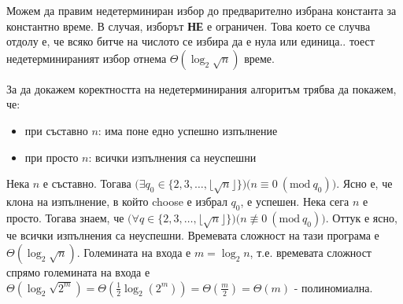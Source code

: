 \begin{solution}
\begin{pseudocode}
{			\KwRet{\Fail\;}
		}
	\end{pseudocode}
	\begin{remark*}
		Можем да правим недетерминиран избор до предварително избрана константа за константно време. В случая, изборът \textbf{НЕ} е ограничен. Това което се случва отдолу е, че всяко битче на числото се избира да е нула или единица.. тоест недетерминираният избор отнема $\Theta(\log_2{\sqrt n})$ време.
	\end{remark*}
	За да докажем коректността на недетерминирания алгоритъм трябва да покажем, че:
	\begin{itemize}
		\item при съставно $n$: има поне едно успешно изпълнение
		\item при просто $n$: всички изпълнения са неуспешни
	\end{itemize}
	Нека $n$ е съставно. Тогава $\big(\exists q_0\in\{2,3,\dots,\lfloor\sqrt n\rfloor\}\big)\big(n\equiv 0\ (\text{mod}\ q_0)\big)$. Ясно е, че клона на изпълнение, в който choose е избрал $q_0$, е успешен. Нека сега $n$ е просто. Тогава знаем, че $\big(\forall q\in\{2,3,\dots,\lfloor\sqrt n\rfloor\}\big)\big(n\not\equiv 0\ (\text{mod}\ q_0)\big)$. Оттук е ясно, че всички изпълнения са неуспешни. Времевата сложност на тази програма е $\Theta(\log_2{\sqrt n})$. Големината на входа е $m=\log_2{n}$, т.е. времевата сложност спрямо големината на входа е $\Theta(\log_2{\sqrt{2^m}})=\Theta(\frac12\log_2(2^m))=\Theta(\frac m2)=\Theta(m)$ - полиномиална.
\end{solution}

